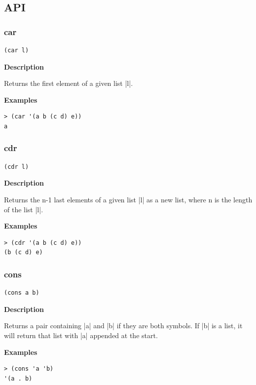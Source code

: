 \documentclass[a4paper]{article}
\begin{document}
\subsection{API}

\subsubsection{car}

\begin{lstlisting}[frame=none]
(car l)
\end{lstlisting}

\textbf{Description}

Returns the first element of a given list |l|.

\textbf{Examples}

\begin{lstlisting}
> (car '(a b (c d) e))
a
\end{lstlisting}

\subsubsection{cdr}

\begin{lstlisting}[frame=none]
(cdr l)
\end{lstlisting}

\textbf{Description}

Returns the n-1 last elements of a given list |l| as a new list, where n is the length of the list |l|.

\textbf{Examples}

\begin{lstlisting}
> (cdr '(a b (c d) e))
(b (c d) e)
\end{lstlisting}

\subsubsection{cons}

\begin{lstlisting}[frame=none]
(cons a b)
\end{lstlisting}

\textbf{Description}

Returns a pair containing |a| and |b| if they are both symbols. If |b| is a list, it will return that list with |a| appended at the start.

\textbf{Examples}

\begin{lstlisting}
> (cons 'a 'b)
'(a . b)
\end{lstlisting}
\end{document}
